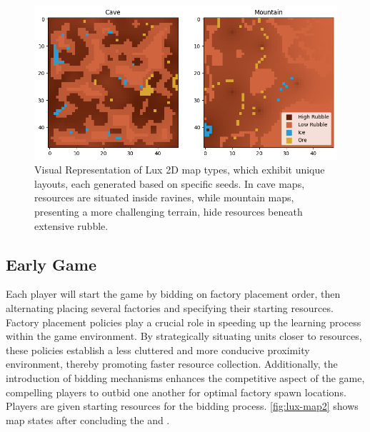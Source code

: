         \begin{figure}[htbp]
            \centering
            \includegraphics[width=0.62\linewidth]{images/intro_luxenv/map/resources.png}
            \captionsetup{justification=justified, singlelinecheck=false, width=1\linewidth, labelfont=bf}    
            \caption{Visual Representation of Lux 2D map types, which exhibit unique layouts, each generated based on specific seeds. In cave maps, resources are situated inside ravines, while mountain maps, presenting a more challenging terrain, hide resources beneath extensive rubble.}
            \label{fig:lux-map}
        \end{figure}


    \subsection{Early Game}
    \label{subsec:early-game}

        \noindent Each player will start the game by bidding on factory placement order, then alternating placing several factories and specifying their starting resources. Factory placement policies play a crucial role in speeding up the learning process within the game environment. By strategically situating units closer to resources, these policies establish a less cluttered and more conducive proximity environment, thereby promoting faster resource collection. Additionally, the introduction of bidding mechanisms enhances the competitive aspect of the game, compelling players to outbid one another for optimal factory spawn locations. Players are given starting resources for the bidding process. \textcolor{deepblue}{\autoref{fig:lux-map2}} shows map states after concluding the  and .
        
